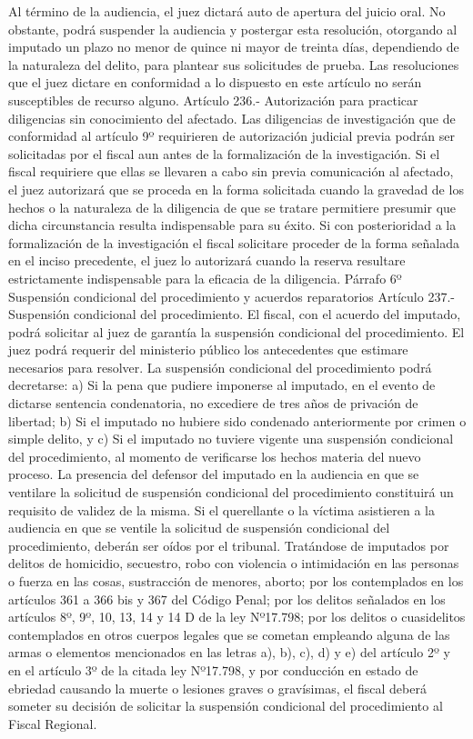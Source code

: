     Al término de la audiencia, el juez dictará auto de apertura del juicio oral. No obstante, podrá suspender la audiencia y postergar esta resolución, otorgando al imputado un plazo no menor de quince ni mayor de treinta días, dependiendo de la naturaleza del delito, para plantear sus solicitudes de prueba.
    Las resoluciones que el juez dictare en conformidad a lo dispuesto en este artículo no serán susceptibles de recurso alguno.
    Artículo 236.- Autorización para practicar diligencias sin conocimiento del afectado. Las diligencias de investigación que de conformidad al artículo 9º requirieren de autorización judicial previa podrán ser solicitadas por el fiscal aun antes de la formalización de la investigación. Si el fiscal requiriere que ellas se llevaren a cabo sin previa comunicación al afectado, el juez autorizará que se proceda en la forma solicitada cuando la gravedad de los hechos o la naturaleza de la diligencia de que se tratare permitiere presumir que dicha circunstancia resulta indispensable para su éxito.
    Si con posterioridad a la formalización de la investigación el fiscal solicitare proceder de la forma señalada en el inciso precedente, el juez lo autorizará cuando la reserva resultare estrictamente indispensable para la eficacia de la diligencia.
    Párrafo 6º Suspensión condicional del procedimiento
y acuerdos reparatorios
    Artículo 237.- Suspensión condicional del procedimiento. El fiscal, con el acuerdo del imputado, podrá solicitar al juez de garantía la suspensión condicional del procedimiento.
    El juez podrá requerir del ministerio público los antecedentes que estimare necesarios para resolver.
    La suspensión condicional del procedimiento podrá decretarse:
    a) Si la pena que pudiere imponerse al imputado, en el evento de dictarse sentencia condenatoria, no excediere de tres años de privación de libertad;
    b) Si el imputado no hubiere sido condenado anteriormente por crimen o simple delito, y
    c) Si el imputado no tuviere vigente una suspensión condicional del procedimiento, al momento de verificarse los hechos materia del nuevo proceso.
    La presencia del defensor del imputado en la audiencia en que se ventilare la solicitud de suspensión condicional del procedimiento constituirá un requisito de validez de la misma.
    Si el querellante o la víctima asistieren a la audiencia en que se ventile la solicitud de suspensión condicional del procedimiento, deberán ser oídos por el tribunal.
    Tratándose de imputados por delitos de homicidio, secuestro, robo con violencia o intimidación en las personas o fuerza en las cosas, sustracción de menores, aborto; por los contemplados en los artículos 361 a 366 bis y 367 del Código Penal; por los delitos señalados en los artículos 8º, 9º, 10, 13, 14 y 14 D de la ley Nº17.798; por los delitos o cuasidelitos contemplados en otros cuerpos legales que se cometan empleando alguna de las armas o elementos mencionados en las letras a), b), c), d) y e) del artículo 2º y en el artículo 3º de la citada ley Nº17.798, y por conducción en estado de ebriedad causando la muerte o lesiones graves o gravísimas, el fiscal deberá someter su decisión de solicitar la suspensión condicional del procedimiento al Fiscal Regional.

